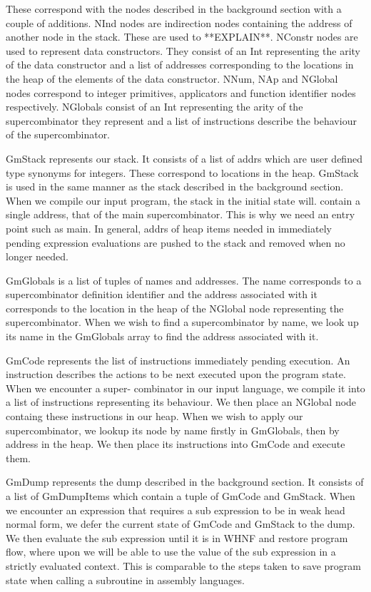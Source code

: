 These correspond with the nodes described in the background section
with a couple of additions. NInd nodes are indirection nodes 
containing the address of another node in the stack. These are
used to **EXPLAIN**. NConstr nodes are used to represent data
constructors. They consist of an Int representing the arity
of the data constructor and a list of addresses corresponding to
the locations in the heap of the elements of the data constructor.
NNum, NAp and NGlobal nodes correspond to integer primitives, 
applicators and function identifier nodes respectively. NGlobals
consist of an Int representing the arity of the supercombinator
they represent and a list of instructions describe the behaviour
of the supercombinator.

GmStack represents our stack. It consists of a list of addrs 
which are user defined type synonyms for integers. These 
correspond to locations in the heap. GmStack is used in the same
manner as the stack described in the background section. When we
compile our input program, the stack in the initial state will.
contain a single address, that of the main supercombinator. This
is why we need an entry point such as main. In general, addrs
of heap items needed in immediately pending expression evaluations
are pushed to the stack and removed when no longer needed.

GmGlobals is a list of tuples of names and addresses. The name
corresponds to a supercombinator definition identifier and the
address associated with it corresponds to the location in the
heap of the NGlobal node representing the supercombinator. When
we wish to find a supercombinator by name, we look up its name
in the GmGlobals array to find the address associated with it.

GmCode represents the list of instructions immediately pending
execution. An instruction describes the actions to be next
executed upon the program state. When we encounter a super-
combinator in our input language, we compile it into a list
of instructions representing its behaviour. We then place an
NGlobal node containg these instructions in our heap. When
we wish to apply our supercombinator, we lookup its node by
name firstly in GmGlobals, then by address in the heap. We
then place its instructions into GmCode and execute them.

GmDump represents the dump described in the background section.
It consists of a list of GmDumpItems which contain a tuple of
GmCode and GmStack. When we encounter an expression that 
requires a sub expression to be in weak head normal form, we
defer the current state of GmCode and GmStack to the dump.
We then evaluate the sub expression until it is in WHNF and restore
program flow, where upon we will be able to use the value of the
sub expression in a strictly evaluated context. This is 
comparable to the steps taken to save program state when
calling a subroutine in assembly languages. 

